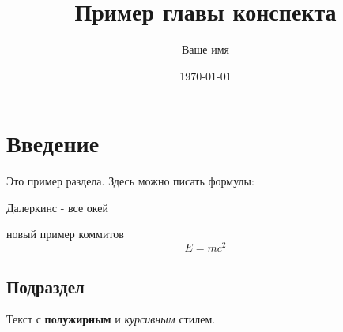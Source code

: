 \documentclass{article}
\title{Пример главы конспекта}
\author{Ваше имя}
\date{\today}
\begin{document}
\maketitle

\section{Введение}
Это пример раздела. Здесь можно писать формулы:

Далеркинс - все окей

новый пример коммитов
\[ E = mc^2 \]

\subsection{Подраздел}
Текст с \textbf{полужирным} и \emph{курсивным} стилем.
\end{document}
